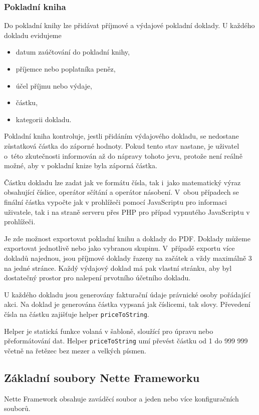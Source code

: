 \documentclass[thesis=B,czech]{FITthesis}[2011/06/14]
\begin{document}
\subsubsection{Pokladní kniha}
Do pokladní knihy lze přidávat příjmové a výdajové pokladní doklady. U každého dokladu evidujeme
\begin{itemize}
	\item datum zaúčtování do pokladní knihy,
	\item příjemce nebo poplatníka peněz,
	\item účel příjmu nebo výdaje,
	\item částku,
	\item kategorii dokladu.
\end{itemize}
Pokladní kniha kontroluje, jestli přidáním výdajového dokladu, se nedostane zůstatková částka do záporné hodnoty. Pokud tento stav nastane, je uživatel o~této zkutečnosti informován až do nápravy tohoto jevu, protože není reálně možné, aby v pokladní knize byla záporná částka.

Částku dokladu lze zadat jak ve formátu čísla, tak i~jako matematický výraz obsahující číslice, operátor sčítání a operátor násobení. V~obou případech se finální částka vypočte jak v prohlížeči pomocí JavaScriptu pro informaci uživatele, tak i na straně serveru přes PHP pro případ vypnutého JavaScriptu v prohlížeči.

Je zde možnost exportovat pokladní knihu a doklady do PDF. Doklady můžeme exportovat jednotlivě nebo jako vybranou skupinu. V~případě exportu více dokladů najednou, jsou příjmové doklady řazeny na začátek a vždy maximálně 3 na jedné stránce. Každý výdajový doklad má pak vlastní stránku, aby byl dostatečný prostor pro nalepení prvotního účetního dokladu.

U každého dokladu jsou generovány fakturační údaje právnické osoby pořádající akci. Na doklad je generována částka vypsaná jak číslicemi, tak slovy. Převedení čísla na částku zajišťuje helper \texttt{priceToString}. 

Helper je statická funkce volaná v šabloně, sloužící pro úpravu nebo přeformátování dat. Helper \texttt{priceToString} umí převést částku od 1 do 999 999 včetně na řetězec bez mezer a velkých písmen.

\subsection{Základní soubory Nette Frameworku}
Nette Framework obsahuje zaváděcí soubor a jeden nebo více konfiguračních souborů. 
 
\end{document}
